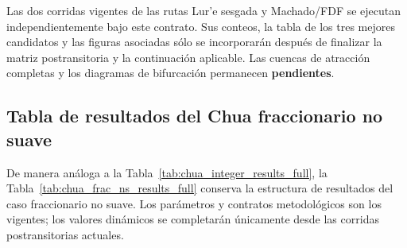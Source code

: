 \documentclass[journal]{IEEEtran}
\begin{document}
Las dos corridas vigentes de las rutas Lur'e sesgada y Machado/FDF se
ejecutan independientemente bajo este contrato. Sus conteos, la tabla de los
tres mejores candidatos y las figuras asociadas sólo se incorporarán después
de finalizar la matriz postransitoria y la continuación aplicable. Las
cuencas de atracción completas y los diagramas de bifurcación permanecen
\textbf{pendientes}.

\subsection{Tabla de resultados del Chua fraccionario no suave}

De manera análoga a la Tabla~\ref{tab:chua_integer_results_full}, la
Tabla~\ref{tab:chua_frac_ns_results_full} conserva la estructura de resultados
del caso fraccionario no suave. Los parámetros y contratos metodológicos son
los vigentes; los valores dinámicos se completarán únicamente desde las
corridas postransitorias actuales.
\end{document}
